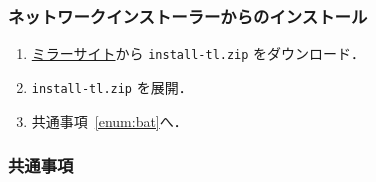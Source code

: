 \subsubsection*{ネットワークインストーラーからのインストール}

\begin{enumerate}
    \item \href{http://mirror.ctan.org/systems/texlive/tlnet/}{ミラーサイト}から \verb|install-tl.zip| をダウンロード．
    \item \verb|install-tl.zip| を展開．
    \item 共通事項~\ref{enum:bat}へ．
\end{enumerate}

\subsubsection*{共通事項}

